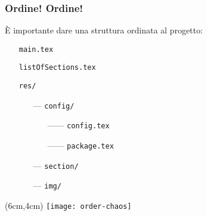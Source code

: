 \begin{frame}
 \frametitle{Ordine! Ordine!}
 
 È importante dare una struttura ordinata al progetto:
 
 \begin{itemize}
  \item[] \texttt{main.tex}
  \item[] \texttt{listOfSections.tex}
  \item[] \texttt{res/}
  \begin{itemize}
    \item[---] \texttt{config/}
    \begin{itemize}
      \item[------] \texttt{config.tex}
      \item[------] \texttt{package.tex}
    \end{itemize}
    \item[---] \texttt{section/}
    \item[---] \texttt{img/}
  \end{itemize}
 \end{itemize}
 
 
 \begin{textblock*}{5cm}(6cm,4cm)
   \texttt{[image: order-chaos]}
 \end{textblock*}


\end{frame}

